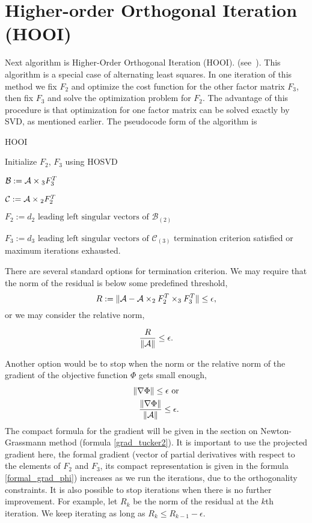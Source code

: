 \section{Higher-order Orthogonal Iteration (HOOI)}

Next algorithm is Higher-Order Orthogonal Iteration (HOOI). (see~\cite{kolda_bader_2009}).
This algorithm is a special case of alternating least squares.
In one iteration of this method we fix $F_2$ and optimize the cost function for the other factor matrix $F_3$,
then fix $F_3$ and solve the optimization problem for $F_2$. 
The advantage of this procedure is that optimization for one factor matrix can be solved exactly
by SVD, as mentioned earlier. The pseudocode form of the algorithm is

\begin{algorithm}
\caption{HOOI}\label{HOOI}
\begin{algorithmic}[1]
\State Initialize $F_2$, $F_3$ using HOSVD
\Repeat 


$\mathcal{B} := \mathcal{A} \times{_3} F_3^T$
    
    
$\mathcal{C} := \mathcal{A} \times{_2} F_2^T$
    
    
$F_2 := d_2 \mbox{ leading left singular vectors of }{\mathcal{B}}_{(2)}$
    
    
    $F_3 := d_3 \mbox{ leading left singular vectors of }{\mathcal{C}}_{(3)}$
\Until termination criterion satisfied or maximum iterations exhausted.
\end{algorithmic}
\end{algorithm}


There are several standard options for termination criterion.
We may require that the norm of the residual is below
some predefined threshold,
\begin{equation}
    R := \| \mathcal{A} - \mathcal{A} \times_2 F_2^T \times_3 F_3^T \| \leq \epsilon,
\end{equation} 
or we may consider the relative norm,

\begin{equation}
    \frac{R}{\| \mathcal{A} \| } \leq \epsilon.
\end{equation} 


Another option would be to stop when the norm or the relative norm of the gradient of the objective
function $\Phi$ gets small enough,
\begin{eqnarray}
    \| \nabla \Phi \| \leq \epsilon \mbox{ or}\\
    \frac{ \| \nabla \Phi \|  }{\| \mathcal{A} \| } \leq \epsilon.
\end{eqnarray} 
The compact formula for the gradient will be given in the section on Newton-Grassmann
method (formula \eqref{grad_tucker2}). It is important to use the projected
gradient here, the formal gradient (vector of partial
derivatives with respect to the elements of $F_2$ and $F_3$, its compact
representation is given in the formula \eqref{formal_grad_phi})
increases as we run the iterations, due to the 
orthogonality constraints.
It is also possible to stop iterations when there is no further improvement. 
For example, let $R_k$ be the norm of the residual
at the {$k$th} iteration. We keep iterating as long as  $R_k \leq R_{k-1} - \epsilon$.
